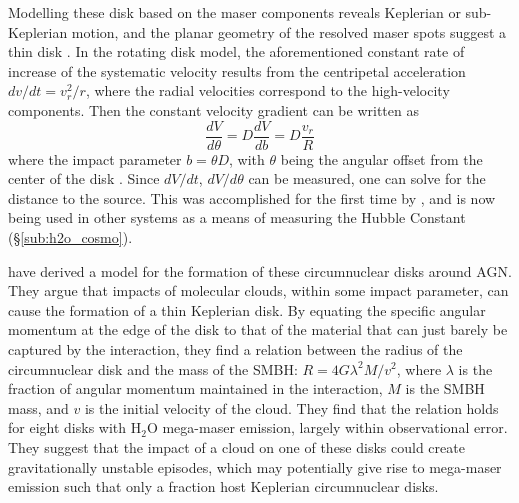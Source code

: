 Modelling these disk based on the maser components reveals Keplerian or sub-Keplerian motion, and the planar geometry of the resolved maser spots suggest a thin disk \citep{lo2005}. In the rotating disk model, the aforementioned constant rate of increase of the systematic velocity results from the centripetal acceleration $dv/dt = v_r^2/r$, where the radial velocities correspond to the high-velocity components. Then the constant velocity gradient can be written as
\begin{equation}
\label{eq:disk_rot}
\frac{dV}{d\theta} = D \frac{dV}{db} = D \frac{v_r}{R}
\end{equation}
where the impact parameter $b= \theta D$, with $\theta$ being the angular offset from the center of the disk \citep{lo2005}. Since $dV/dt$, $dV/d\theta$ can be measured, one can solve for the distance to the source. This was accomplished for the first time by \citet{Miyoshi_1994}, and is now being used in other systems as a means of measuring the Hubble Constant (\S\ref{sub:h2o_cosmo}).

\citet{wardle2012_bhmass} have derived a model for the formation of these circumnuclear disks around AGN. They argue that impacts of molecular clouds, within some impact parameter, can cause the formation of a thin Keplerian disk. By equating the specific angular momentum at the edge of the disk to that of the material that can just barely be captured by the interaction, they find a relation between the radius of the circumnuclear disk and the mass of the SMBH: $R=4G\lambda^2M/v^2$, where $\lambda$ is the fraction of angular momentum maintained in the interaction, $M$ is the SMBH mass, and $v$ is the initial velocity of the cloud. They find that the relation holds for eight disks with H$_2$O mega-maser emission, largely within observational error. They suggest that the impact of a cloud on one of these disks could create gravitationally unstable episodes, which may potentially give rise to mega-maser emission \citep{Milosavljevi_2004} such that only a fraction host Keplerian circumnuclear disks.

